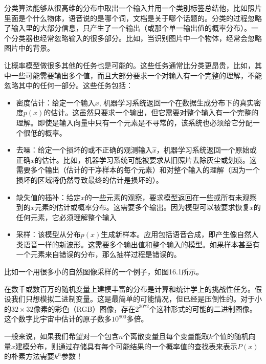 分类算法能够从很高维的分布中取出一个输入并用一个类别标签总结他，比如照片里面是个什么物体，语音说的是哪个词，文档是关于哪个话题的。分类的过程忽略了输入里的大部分信息，只产生了一个输出（或那个单一输出值的概率分布）。一个分类器也经常忽略输入的很多部分。比如，当识别图片中一个物体，经常会忽略图片中的背景。

让概率模型做很多其他的任务也是可能的。这些任务通常比分类更昂贵，比如，其中一些可能需要输出多个值，而且大部分要求一个对输入有一个完整的理解，不能忽略其中的任何一部分。这些任务包括：
\begin{itemize}
\item 密度估计：给定一个输入$x$, 机器学习系统返回一个在数据生成分布下的真实密度$p(x)$的估计。这虽然只要求一个输出，但它需要对整个输入有一个完整的理解。即使是输入向量中只有一个元素是不寻常的，该系统也必须给它分配一个很低的概率。
\item 去噪：给定一个损坏的或不正确的观测输入$\hat{x}$，机器学习系统返回一个原始或正确$x$的估计。比如，机器学习系统可能被要求从旧照片去除灰尘或划痕。这需要多个输出（估计的干净样本的每个元素）和对整个输入的理解（因为一个损坏的区域将仍然导致最终的估计是损坏的）。
\item 缺失值的插补：给定$x$的一些元素的观察，要求模型返回在一些或所有未观察到的$x$元素的估计或概率分布。这需要多个输出。因为模型可以被要求恢复$x$的任何元素，它必须理解整个输入
\item 采样：该模型从分布$p(x)$生成新样本。应用包括语音合成，即产生像自然人类语音一样的新波形。这需要多个输出值和整个输入的模型。如果样本甚至有一个元素来自错误的分布，那么抽样过程是错误的。
\end{itemize}

比如一个用很多小的自然图像采样的一个例子，如图16.1所示。

在数千或数百万的随机变量上建模丰富的分布是计算和统计学上的挑战性任务。假设我们只想模拟二进制变量。这是最简单的可能情况，但已经是压倒性的。对于小的$32×32$像素的彩色（RGB）图像，存在$2^3072$个这种形式的可能的二进制图像。这个数字比宇宙中估计的原子数多$10^800$多倍。

一般来说，如果我们希望对一个包含$n$个离散变量且每个变量能取$k$个值的随机向量$x$建模分布，则通过存储具有每个可能结果的一个概率值的查找表来表示$P(x)$的朴素方法需要$k^n$参数！

